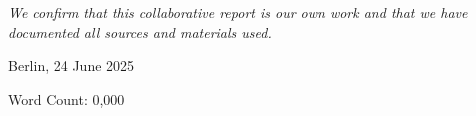 \chapter*{}
\vspace{17cm}
\hfill\parbox{8cm}{
\raggedleft
	\textit{We confirm that this collaborative report is our own work and that we have documented all sources and materials used.}\par 
	\vspace{1em}
	Berlin, 24 June 2025

	\vspace{3em}
	{\footnotesize Word Count: 0,000}
}
\thispagestyle{empty}